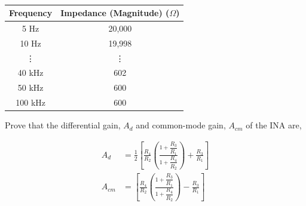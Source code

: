 \documentclass[12pt]{article}
\begin{document}
	\captionsetup[table]{labelsep=newline, font=normalfont}	%
	\begin{table}[H]
		\centering
		\caption{\jadual}	%
		\begin{tabular}{cc}
			\toprule
			\multicolumn{1}{l}{\textbf{Frequency}} & \multicolumn{1}{l}{\textbf{Impedance (Magnitude) ($\Omega$)}} \\
			\midrule
			5 Hz  & 20,000 \\
			10 Hz & 19,998 \\
			\vdots     & \vdots \\
			40 kHz & 602 \\
			50 kHz & 600 \\
			100 kHz & 600 \\
			\bottomrule
		\end{tabular}
		\label{table:freqmag2}%
	\end{table}%
	
	\listbeginx
	\item Prove that the differential gain, $A_d$ and common-mode gain, $A_{cm}$ of the INA are, 
	
	
	\begin{align*} 
		A_d &= \frac{1}{2}
		\left[
			\frac{R_4}{R_2}
				\left(\frac
					{1+\dfrac{R_3}{R_1}}
					{1+\dfrac{R_4}{R_2}}
				\right)
			+\frac{R_3}{R_1}
		\right] \\
		A_{cm} &= 
		\left[
			\frac{R_4}{R_2}
				\left(\frac
					{1+\dfrac{R_3}{R_1}}
					{1+\dfrac{R_4}{R_2}}
				\right)
			-\frac{R_3}{R_1}
		\right] 
	\end{align*}

	
\end{document}
